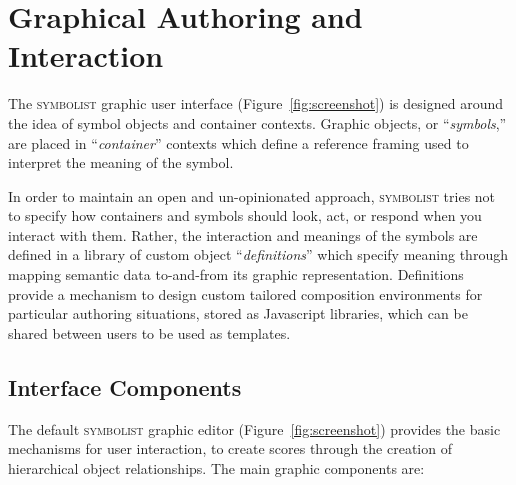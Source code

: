 \documentclass{article}
\def\symbolist{\textsc{symbolist}\xspace}
\begin{document}
\section{Graphical Authoring and Interaction}\label{sec:editor} 

The \symbolist graphic user interface (Figure~\ref{fig:screenshot}) is designed around the idea of symbol objects and container contexts. Graphic objects, or ``\textit{symbols},'' are placed in ``\textit{container}'' contexts which define a reference framing used to interpret the meaning of the symbol.

In order to maintain an open and un-opinionated approach, \symbolist tries not to specify how containers and symbols should look, act, or respond when you interact with them. 
Rather, the interaction and meanings of the symbols are defined in a library of custom object ``\textit{definitions}'' which specify meaning through mapping semantic data to-and-from its graphic representation. 
Definitions provide a mechanism to design custom tailored composition environments for particular authoring situations, stored as Javascript libraries, which can be shared between users to be used as templates.


\subsection{Interface Components}\label{sec:interface_components}


The default \symbolist graphic editor (Figure~\ref{fig:screenshot}) provides the basic mechanisms for user interaction, to create scores through the creation of hierarchical object relationships.
The main graphic components are:
\end{document}
